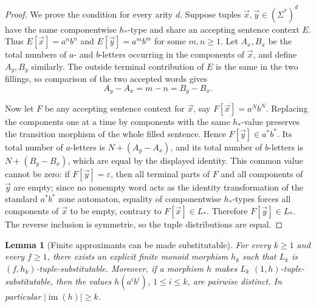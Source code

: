 \documentclass[11pt,a4paper]{article}
\newtheorem{lemma}[theorem]{Lemma}
\theoremstyle{remark}
\newcommand{\tuple}[1]{\vec{#1}}
\newcommand{\eps}{\varepsilon}
\begin{document}
\begin{proof}
We prove the condition for every arity \(d\).  Suppose tuples
\(\tuple x,\tuple y\in(\Sigma^*)^d\) have the same componentwise \(h_*\)-type
and share an accepting sentence context \(E\).  Thus
\(E[\tuple x]=a^n b^n\) and \(E[\tuple y]=a^m b^m\) for some \(m,n\ge1\).
Let \(A_x,B_x\) be the total numbers of \(a\)- and \(b\)-letters occurring in
the components of \(\tuple x\), and define \(A_y,B_y\) similarly.  The outside
terminal contribution of \(E\) is the same in the two fillings, so comparison
of the two accepted words gives
\[
  A_y-A_x=m-n=B_y-B_x .
\]

Now let \(F\) be any accepting sentence context for \(\tuple x\), say
\(F[\tuple x]=a^N b^N\).  Replacing the components one at a time by components
with the same \(h_*\)-value preserves the transition morphism of the whole
filled sentence.  Hence \(F[\tuple y]\in a^*b^*\).  Its total number of
\(a\)-letters is \(N+(A_y-A_x)\), and its total number of \(b\)-letters is
\(N+(B_y-B_x)\), which are equal by the displayed identity.  This common value
cannot be zero: if \(F[\tuple y]=\eps\), then all terminal parts of \(F\) and
all components of \(\tuple y\) are empty; since no nonempty word acts as the
identity transformation of the standard \(a^*b^*\) zone automaton, equality of
componentwise \(h_*\)-types forces all components of \(\tuple x\) to be empty,
contrary to \(F[\tuple x]\in L_*\).  Therefore \(F[\tuple y]\in L_*\).  The
reverse inclusion is symmetric, so the tuple distributions are equal.
\end{proof}

\begin{lemma}[Finite approximants can be made substitutable]
\label{lem:finite-approximants-substitutable}
For every \(k\ge1\) and every \(f\ge1\), there exists an explicit finite monoid
morphism \(h_k\) such that \(L_k\) is \((f,h_k)\)-tuple-substitutable.  Moreover,
if a morphism \(h\) makes \(L_k\) \((1,h)\)-tuple-substitutable, then the values
\(h(a^i b^i)\), \(1\le i\le k\), are pairwise distinct.  In particular
\(|\operatorname{im}(h)|\ge k\).
\end{lemma}
\end{document}
